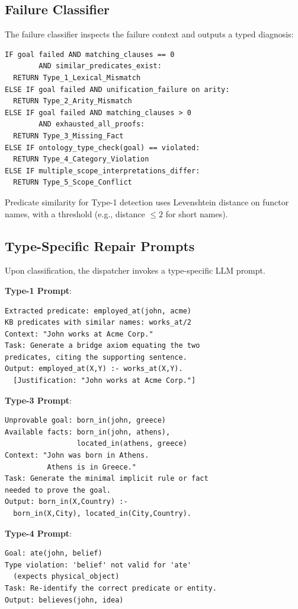 \documentclass[11pt,letterpaper]{article}
\begin{document}
\subsection{Failure Classifier}

The failure classifier inspects the failure context and outputs a typed diagnosis:

\begin{lstlisting}[language={}]
IF goal failed AND matching_clauses == 0
        AND similar_predicates_exist:
  RETURN Type_1_Lexical_Mismatch
ELSE IF goal failed AND unification_failure on arity:
  RETURN Type_2_Arity_Mismatch
ELSE IF goal failed AND matching_clauses > 0
        AND exhausted_all_proofs:
  RETURN Type_3_Missing_Fact
ELSE IF ontology_type_check(goal) == violated:
  RETURN Type_4_Category_Violation
ELSE IF multiple_scope_interpretations_differ:
  RETURN Type_5_Scope_Conflict
\end{lstlisting}

Predicate similarity for Type-1 detection uses Levenshtein distance on functor names,
with a threshold (e.g., distance $\leq 2$ for short names).

\subsection{Type-Specific Repair Prompts}

Upon classification, the dispatcher invokes a type-specific LLM prompt.

\textbf{Type-1 Prompt}:
\begin{lstlisting}[language={}]
Extracted predicate: employed_at(john, acme)
KB predicates with similar names: works_at/2
Context: "John works at Acme Corp."
Task: Generate a bridge axiom equating the two
predicates, citing the supporting sentence.
Output: employed_at(X,Y) :- works_at(X,Y).
  [Justification: "John works at Acme Corp."]
\end{lstlisting}

\textbf{Type-3 Prompt}:
\begin{lstlisting}[language={}]
Unprovable goal: born_in(john, greece)
Available facts: born_in(john, athens),
                 located_in(athens, greece)
Context: "John was born in Athens.
          Athens is in Greece."
Task: Generate the minimal implicit rule or fact
needed to prove the goal.
Output: born_in(X,Country) :-
  born_in(X,City), located_in(City,Country).
\end{lstlisting}

\textbf{Type-4 Prompt}:
\begin{lstlisting}[language={}]
Goal: ate(john, belief)
Type violation: 'belief' not valid for 'ate'
  (expects physical_object)
Task: Re-identify the correct predicate or entity.
Output: believes(john, idea)
\end{lstlisting}
\end{document}
